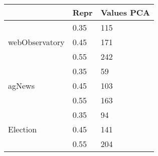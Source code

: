 \begin{table*}
\begin{tabular}{|l|l|l|}
 & Repr & Values PCA\\ \hline
\multirow{3}{*}{webObservatory} & 0.35 & 115\\ \hline
 & 0.45 & 171\\ \cline{2-3}
 & 0.55 & 242\\ \cline{2-3}
\multirow{3}{*}{agNews} & 0.35 & 59\\ \hline
 & 0.45 & 103\\ \cline{2-3}
 & 0.55 & 163\\ \cline{2-3}
\multirow{3}{*}{Election} & 0.35 & 94\\ \hline
 & 0.45 & 141\\ \cline{2-3}
 & 0.55 & 204\\ \hline
\end{tabular}
\end{table*}

